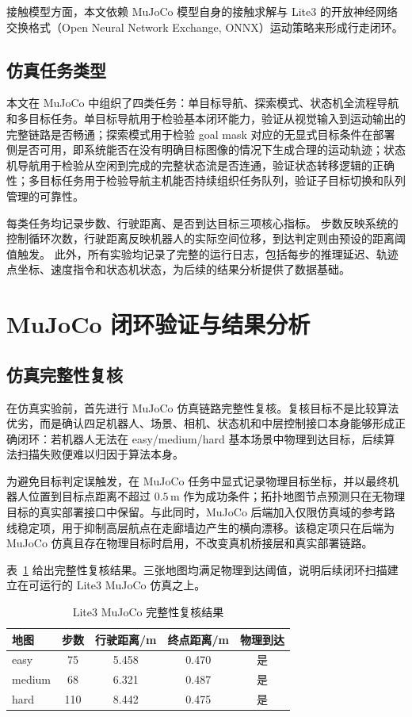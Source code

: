 接触模型方面，本文依赖 MuJoCo 模型自身的接触求解与 Lite3 的开放神经网络交换格式（Open Neural Network Exchange, ONNX）运动策略来形成行走闭环。

\subsection{仿真任务类型}

本文在 MuJoCo 中组织了四类任务：单目标导航、探索模式、状态机全流程导航和多目标任务。单目标导航用于检验基本闭环能力，验证从视觉输入到运动输出的完整链路是否畅通；探索模式用于检验 goal mask 对应的无显式目标条件在部署侧是否可用，即系统能否在没有明确目标图像的情况下生成合理的运动轨迹；状态机导航用于检验从空闲到完成的完整状态流是否连通，验证状态转移逻辑的正确性；多目标任务用于检验导航主机能否持续组织任务队列，验证子目标切换和队列管理的可靠性。

每类任务均记录步数、行驶距离、是否到达目标三项核心指标。
步数反映系统的控制循环次数，行驶距离反映机器人的实际空间位移，到达判定则由预设的距离阈值触发。
此外，所有实验均记录了完整的运行日志，包括每步的推理延迟、轨迹点坐标、速度指令和状态机状态，为后续的结果分析提供了数据基础。

\section{MuJoCo 闭环验证与结果分析}\label{sec:mujoco-results}

\subsection{仿真完整性复核}

在仿真实验前，首先进行 MuJoCo 仿真链路完整性复核。复核目标不是比较算法优劣，而是确认四足机器人、场景、相机、状态机和中层控制接口本身能够形成正确闭环：若机器人无法在 easy/medium/hard 基本场景中物理到达目标，后续算法扫描失败便难以归因于算法本身。

为避免目标判定误触发，在 MuJoCo 任务中显式记录物理目标坐标，并以最终机器人位置到目标点距离不超过 $0.5\,\mathrm{m}$ 作为成功条件；拓扑地图节点预测只在无物理目标的真实部署接口中保留。与此同时，MuJoCo 后端加入仅限仿真域的参考路线稳定项，用于抑制高层航点在走廊墙边产生的横向漂移。该稳定项只在后端为 MuJoCo 仿真且存在物理目标时启用，不改变真机桥接层和真实部署链路。

表~\ref{tab:mujoco-health-check} 给出完整性复核结果。三张地图均满足物理到达阈值，说明后续闭环扫描建立在可运行的 Lite3 MuJoCo 仿真之上。

\begin{table}[htbp]
    \centering
    \caption{Lite3 MuJoCo 完整性复核结果}
    \label{tab:mujoco-health-check}
    \begin{tabular}{lcccc}
        \toprule
        地图 & 步数 & 行驶距离/m & 终点距离/m & 物理到达 \\
        \midrule
        easy & 75 & 5.458 & 0.470 & 是 \\
        medium & 68 & 6.321 & 0.487 & 是 \\
        hard & 110 & 8.442 & 0.475 & 是 \\
        \bottomrule
    \end{tabular}
\end{table}

